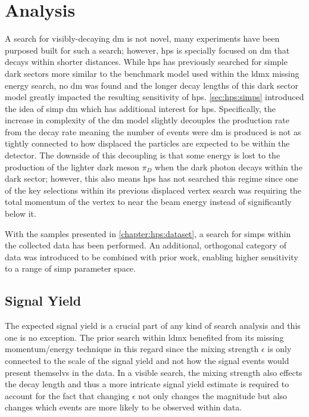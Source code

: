 \chapter{Analysis}
\label{chapter:hps:analysis}

A search for visibly-decaying \ac{dm} is not novel, many experiments have been purposed
built for such a search; however, \ac{hps} is specially focused on \ac{dm} that decays
within shorter distances.
While \ac{hps} has previously searched \cite{hps-2016-displaced-vtx} for simple dark sectors
more similar to the benchmark model used within the \ac{ldmx} missing energy search,
no \ac{dm} was found and the longer decay lengths of this dark sector model greatly
impacted the resulting sensitivity of \ac{hps}.
\cref{sec:hps:simps} introduced the idea of \ac{simp} \ac{dm} which has additional
interest for \ac{hps}.
Specifically, the increase in complexity of the \ac{dm} model slightly decouples the production
rate from the decay rate meaning the number of events were \ac{dm} is produced is not as tightly
connected to how displaced the particles are expected to be within the detector.
The downside of this decoupling is that some energy is lost to the production of the lighter
dark meson $\pi_D$ when the dark photon decays within the dark sector; however,
this also means \ac{hps} has not searched this regime since one of the key selections within
its previous displaced vertex search was requiring the total momentum of the vertex to
near the beam energy instead of significantly below it.

With the samples presented in \cref{chapter:hps:dataset}, a search for \acp{simp} within the collected
data has been performed.
An additional, orthogonal category of data was introduced to be combined with prior work,
enabling higher sensitivity to a range of \ac{simp} parameter space.

\section{Signal Yield}

The expected signal yield is a crucial part of any kind of search analysis
and this one is no exception.
The prior search within \ac{ldmx} benefited from its missing momentum/energy technique
in this regard since the mixing strength $\epsilon$ is only connected to the scale of the signal
yield and not how the signal events would present themselvs in the data.
In a visible search, the mixing strength also effects the decay length and thus a more intricate
signal yield estimate is required to account for the fact that changing $\epsilon$ not only changes
the magnitude but also changes which events are more likely to be observed within data.

